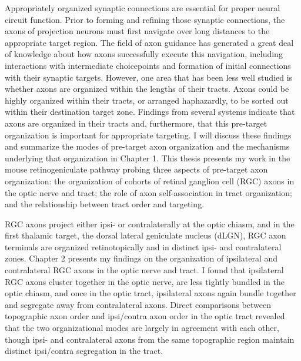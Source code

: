 Appropriately organized synaptic connections are essential for proper neural circuit function.
Prior to forming and refining those synaptic connections, the axons of projection neurons must first navigate over long distances to the appropriate target region.
The field of axon guidance has generated a great deal of knowledge about how axons successfully execute this navigation, including interactions with intermediate choicepoints and formation of initial connections with their synaptic targets.
However, one area that has been less well studied is whether axons are organized within the lengths of their tracts.
Axons could be highly organized within their tracts, or arranged haphazardly, to be sorted out within their destination target zone.
Findings from several systems indicate that axons are organized in their tracts and, furthermore, that this pre-target organization is important for appropriate targeting.
I will discuss these findings and summarize the modes of pre-target axon organization and the mechanisms underlying that organization in Chapter 1.
This thesis presents my work in the mouse retinogeniculate pathway probing three aspects of pre-target axon organization: the organization of cohorts of retinal ganglion cell (RGC) axons in the optic nerve and tract; the role of axon self-association in tract organization; and the relationship between tract order and targeting. 

RGC axons project either ipsi- or contralaterally at the optic chiasm, and in the first thalamic target, the dorsal lateral geniculate nucleus (dLGN), RGC axon terminals are organized retinotopically and in distinct ipsi- and contralateral zones.
Chapter 2 presents my findings on the organization of ipsilateral and contralateral RGC axons in the optic nerve and tract.
I found that ipsilateral RGC axons cluster together in the optic nerve, are less tightly bundled in the optic chiasm, and once in the optic tract, ipsilateral axons again bundle together and segregate away from contralateral axons.
Direct comparisons between topographic axon order and ipsi/contra axon order in the optic tract revealed that the two organizational modes are largely in agreement with each other, though ipsi- and contralateral axons from the same topographic region maintain distinct ipsi/contra segregation in the tract.

